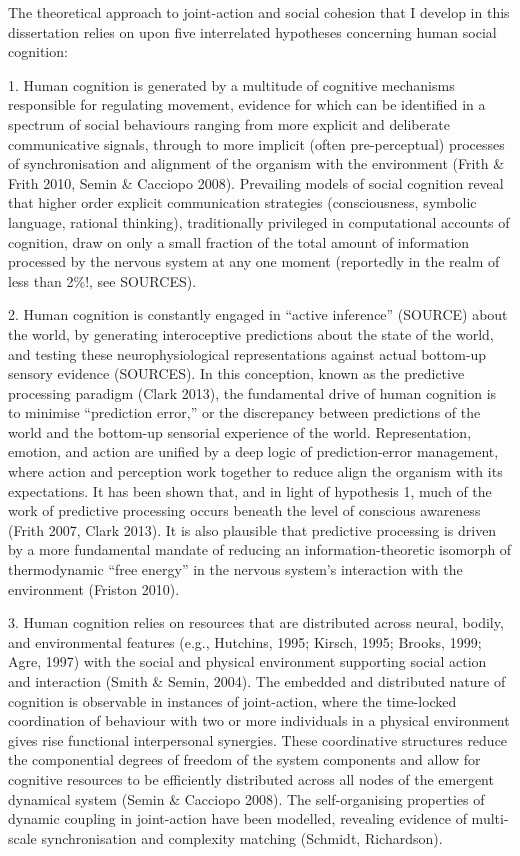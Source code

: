    The theoretical approach to joint-action and social cohesion that I develop in this dissertation relies on upon five interrelated hypotheses concerning human social cognition:

    1. Human cognition is generated by a multitude of cognitive mechanisms responsible for regulating movement, evidence for which can be identified in a spectrum of social behaviours ranging from more explicit and deliberate communicative signals, through to more implicit (often pre-perceptual) processes of synchronisation and alignment of the organism with the environment (Frith & Frith 2010, Semin & Cacciopo 2008). Prevailing models of social cognition reveal that higher order explicit communication strategies (consciousness, symbolic language, rational thinking), traditionally privileged in computational accounts of cognition, draw on only a small fraction of the total amount of information processed by the nervous system at any one moment (reportedly in the realm of less than 2\%!, see SOURCES).


    2. Human cognition is constantly engaged in ``active inference'' (SOURCE) about the world, by generating interoceptive predictions about the state of the world, and testing these neurophysiological representations against actual bottom-up sensory evidence (SOURCES).  In this conception, known as the predictive processing paradigm (Clark 2013), the fundamental drive of human cognition is to minimise ``prediction error,'' or the discrepancy between predictions of the world and the bottom-up sensorial experience of the world.  Representation, emotion, and action are unified by a deep logic of prediction-error management, where action and perception work together to reduce align the organism with its expectations.  It has been shown that, and in light of hypothesis 1, much of the work of predictive processing occurs beneath the level of conscious awareness (Frith 2007, Clark 2013). It is also plausible that predictive processing is driven by a more fundamental mandate of reducing an information-theoretic isomorph of thermodynamic ``free energy'' in the nervous system's interaction with the environment (Friston 2010).


    3. Human cognition relies on resources that are distributed across neural, bodily, and environmental features (e.g., Hutchins, 1995; Kirsch, 1995; Brooks, 1999; Agre, 1997) with the social and physical environment supporting social action and interaction (Smith & Semin, 2004).  The embedded and distributed nature of cognition is observable in instances of joint-action, where the time-locked coordination of behaviour with two or more individuals in a physical environment gives rise functional interpersonal synergies.  These coordinative structures reduce the componential degrees of freedom of the system components and allow for cognitive resources to be efficiently distributed across all nodes of the emergent dynamical system (Semin & Cacciopo 2008).  The self-organising properties of dynamic coupling in joint-action have been modelled, revealing evidence of multi-scale synchronisation and complexity matching (Schmidt, Richardson).


